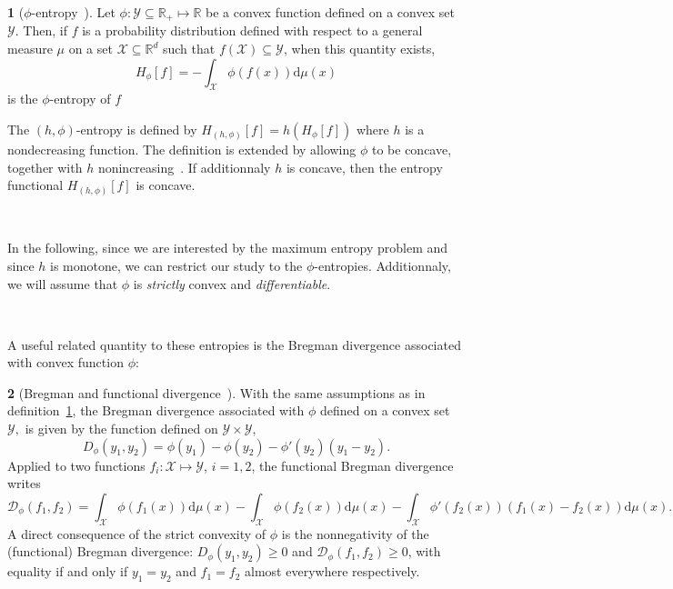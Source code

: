 \documentclass[english,sort&compress]{elsarticle}
\theoremstyle{definition}
\newtheorem{defn}{\protect\definitionname}
\theoremstyle{plain}
\theoremstyle{plain}
\providecommand{\definitionname}{Definition}
\def\dmu{\mathrm{d}\mu}
\def\fD{\mathcal{D}}
\def\Rset{\mathbb{R}}
\def\X{\mathcal{X}}
\def\Y{\mathcal{Y}}
\begin{document}
\begin{defn}[$\phi$-entropy~\cite{BurRao82}]
\label{def:phi-entropy}
Let $\phi: \Y \subseteq \Rset_+ \mapsto \Rset$ be a convex function defined on a
convex  set $\Y$.   Then,  if $f$  is  a probability  distribution defined  with
respect to  a general measure  $\mu$ on a  set $\X \subseteq \Rset^d$  such that
$f(\X) \subseteq \Y$, when this quantity exists,
  \begin{equation}\label{eq:phi-entropy}
    H_{\phi}[f] = - \int_\X \phi(f(x)) \dmu(x)
  \end{equation}
  is  the $\phi$-entropy  of  $f$
\end{defn}
%
The $(h,\phi)$-entropy is defined by $H_{(h,\phi)}[f] = h\left(H_\phi[f]\right)$
where $h$ is  a nondecreasing function.  The definition  is extended by allowing
$\phi$  to be  concave, together  with $h$  nonincreasing~\cite{Csi67, SalMen93,
  Sal94,  MenMor97, Par06}.  If additionnaly  $h$ is  concave, then  the entropy
functional $H_{(h,\phi)}[f]$ is concave.

\

In the  following, since we  are interested by  the maximum entropy  problem and
since  $h$ is  monotone,  we can  restrict  our study  to the  $\phi$-entropies.
Additionnaly,  we will  assume that  $\phi$ is  {\em strictly}  convex  and {\em
  differentiable}.

\

A  useful  related  quantity  to  these  entropies  is  the  Bregman  divergence
associated with convex function $\phi$:
%
\begin{defn}[Bregman and functional divergence~\cite{Bre67, Bas13}]
\label{def:Bregman}
With the  same assumptions  as in definition~\ref{def:phi-entropy},  the Bregman
divergence associated with $\phi$ defined on  a convex set $\Y,$ is given by the
function defined on $\Y \times \Y$,
  \begin{equation}\label{eq:Bregman}
    D_\phi(y_1,y_2) = \phi(y_1) - \phi(y_2) - \phi'(y_2) \left(y_1-y_2\right).
  \end{equation}
  Applied  to two  functions  $f_i: \X  \mapsto  \Y$, $i=1,  2$, the  functional
  Bregman divergence writes
  \begin{equation}
  \label{eq:FctBregman}
  \fD_\phi(f_1,f_2)  =  \int_\X  \phi(f_1(x))  \dmu(x)  -  \int_\X  \phi(f_2(x))
  \dmu(x) - \int_\X \phi'(f_2(x)) \left( f_1(x) - f_2(x) \right) \dmu(x).
  \end{equation}
  A direct consequence of the strict convexity of $\phi$ is the nonnegativity of
  the   (functional)   Bregman   divergence:   $D_\phi(y_1,y_2)   \ge   0$   and
  $\fD_\phi(f_1,f_2) \ge 0$, with equality if and  only if $y_1 = y_2$ and $f_1 =
  f_2$ almost everywhere respectively.
\end{defn}
\end{document}
